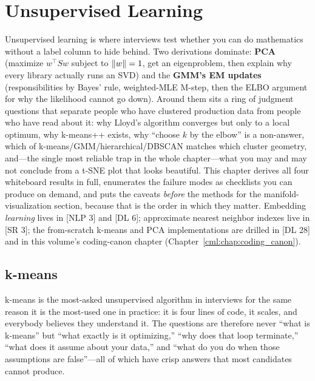 \chapter{Unsupervised Learning}
\label{cml:chap:unsupervised}

\begin{tldr}
Unsupervised learning is where interviews test whether you can do mathematics without a label column to hide behind. Two derivations dominate: \textbf{PCA} (maximize $w^\top S w$ subject to $\left\lVert w\right\rVert=1$, get an eigenproblem, then explain why every library actually runs an SVD) and the \textbf{GMM's EM updates} (responsibilities by Bayes' rule, weighted-MLE M-step, then the ELBO argument for why the likelihood cannot go down). Around them sits a ring of judgment questions that separate people who have clustered production data from people who have read about it: why Lloyd's algorithm converges but only to a local optimum, why k-means++ exists, why ``choose $k$ by the elbow'' is a non-answer, which of k-means/GMM/hierarchical/DBSCAN matches which cluster geometry, and---the single most reliable trap in the whole chapter---what you may and may not conclude from a t-SNE plot that looks beautiful. This chapter derives all four whiteboard results in full, enumerates the failure modes as checklists you can produce on demand, and puts the caveats \emph{before} the methods for the manifold-visualization section, because that is the order in which they matter. Embedding \emph{learning} lives in [NLP 3] and [DL 6]; approximate nearest neighbor indexes live in [SR 3]; the from-scratch k-means and PCA implementations are drilled in [DL 28] and in this volume's coding-canon chapter (Chapter~\ref{cml:chap:coding_canon}).
\end{tldr}

\section{k-means}
\label{cml:sec:kmeans}

k-means is the most-asked unsupervised algorithm in interviews for the same reason it is the most-used one in practice: it is four lines of code, it scales, and everybody believes they understand it. The questions are therefore never ``what is k-means'' but ``what exactly is it optimizing,'' ``why does that loop terminate,'' ``what does it assume about your data,'' and ``what do you do when those assumptions are false''---all of which have crisp answers that most candidates cannot produce.

